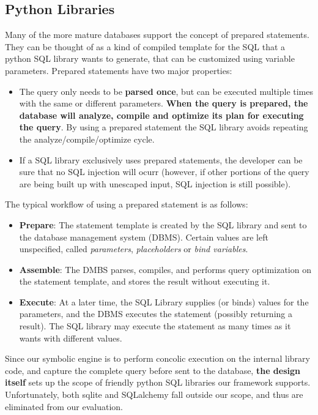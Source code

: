 \documentclass[conference]{IEEEtran}
\begin{document}
\subsection{Python Libraries}
Many of the more mature databases support the concept of prepared statements. They can be thought of as a kind of compiled template for the SQL that a python SQL library wants to generate, that can be customized using variable parameters. Prepared statements have two major properties:
\begin{itemize}
\item The query only needs to be {\bf parsed once}, but can be executed multiple times with the same or different parameters. {\bf When the query is prepared, the database will analyze, compile and optimize its plan for executing the query}. By using a prepared statement the SQL library avoids repeating the analyze/compile/optimize cycle.
\item If a SQL library exclusively uses prepared statements, the developer can be sure that no SQL injection will ocurr (however, if other portions of the query are being built up with unescaped input, SQL injection is still possible).
\end{itemize}
The typical workflow of using a prepared statement is as follows:
\begin{itemize}
\item {\bf Prepare}:
The statement template is created by the SQL library and sent to the database management system (DBMS). Certain values are left unspecified, called \emph{parameters}, \emph{placeholders} or \emph{bind variables}.
\item {\bf Assemble}:
The DMBS parses, compiles, and performs query optimization on the statement template, and stores the result without executing it.
\item {\bf Execute}:
At a later time, the SQL Library supplies (or binds) values for the parameters, and the DBMS executes the statement (possibly returning a result). The SQL library may execute the statement as many times as it wants with different values.
\end{itemize}
Since our symbolic engine is to perform concolic execution on the internal library code, and capture the complete query before sent to the database, {\bf the design itself} sets up the scope of friendly python SQL libraries our framework supports. Unfortunately, both sqlite and SQLalchemy fall outside our scope, and thus are eliminated from our evaluation.
\end{document}

